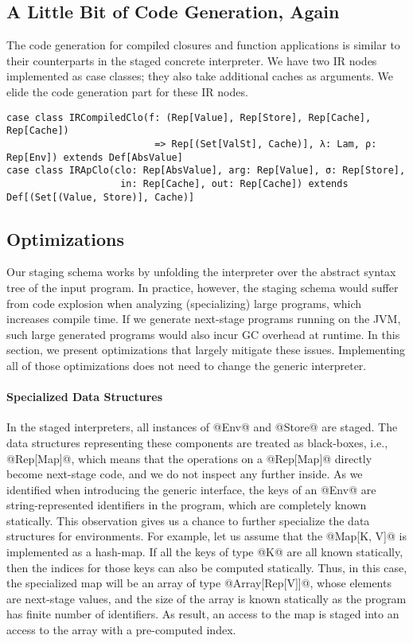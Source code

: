 \subsection{A Little Bit of Code Generation, Again}
The code generation for compiled closures and function applications is similar
to their counterparts in the staged concrete interpreter. We have two IR nodes
implemented as case classes; they also take additional caches as arguments. We
elide the code generation part for these IR nodes.
\begin{lstlisting}
case class IRCompiledClo(f: (Rep[Value], Rep[Store], Rep[Cache], Rep[Cache])
                          => Rep[(Set[ValSt], Cache)], λ: Lam, ρ: Rep[Env]) extends Def[AbsValue]
case class IRApClo(clo: Rep[AbsValue], arg: Rep[Value], σ: Rep[Store],
                    in: Rep[Cache], out: Rep[Cache]) extends Def[(Set[(Value, Store)], Cache)]
\end{lstlisting}

\subsection{Optimizations} \label{staged_ds}

Our staging schema works by unfolding the interpreter over the abstract syntax
tree of the input program. In practice, however, the staging schema would
suffer from code explosion when analyzing (specializing) large programs, which
increases compile time. If we generate next-stage programs running on the JVM,
such large generated programs would also incur GC overhead at runtime. In this
section, we present optimizations that largely mitigate these issues.
Implementing all of those optimizations does not need to change the generic
interpreter.

\paragraph{Specialized Data Structures}

In the staged interpreters, all instances of @Env@ and @Store@ are staged. The
data structures representing these components are treated as black-boxes, i.e.,
@Rep[Map]@, which means that the operations on a @Rep[Map]@ directly become
next-stage code, and we do not inspect any further inside. As we identified when
introducing the generic interface, the keys of an @Env@ are string-represented
identifiers in the program, which are completely known statically. This
observation gives us a chance to further specialize the data structures for environments.
For example, let us assume that the @Map[K, V]@ is implemented as a hash-map.
If all the keys of type @K@ are all known statically, then the indices for
those keys can also be computed statically. Thus, in this case, the specialized
map will be an array of type @Array[Rep[V]]@, whose elements are next-stage
values, and the size of the array is known statically as the program has finite
number of identifiers. As result, an access to the map is staged into an access
to the array with a pre-computed index.

